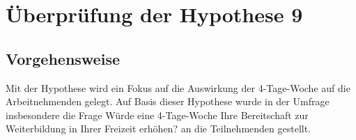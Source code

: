 
\chapter{Überprüfung der Hypothese 9}
\label{chap:hypothese9}

\section{Vorgehensweise}
Mit der Hypothese  wird ein Fokus auf die 
Auswirkung der 4-Tage-Woche auf die Arbeitnehmenden gelegt. Auf Basis dieser Hypothese 
wurde in der Umfrage
insbesondere die Frage \glqq{}Würde eine 4-Tage-Woche Ihre Bereitschaft zur Weiterbildung in 
Ihrer Freizeit erhöhen? \grqq{} an die Teilnehmenden gestellt.








